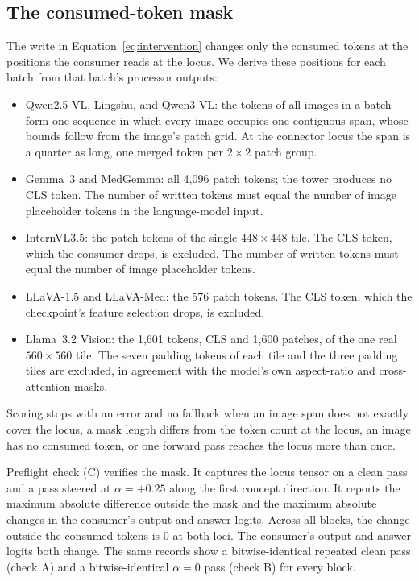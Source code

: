 \subsection{The consumed-token mask}
\label{app:repro-mask}

The write in Equation~\ref{eq:intervention} changes only the consumed tokens at the positions the consumer reads at the locus. We derive these positions for each batch from that batch's processor outputs:

\begin{itemize}[leftmargin=*,itemsep=1pt,topsep=2pt]
\item Qwen2.5-VL, Lingshu, and Qwen3-VL: the tokens of all images in a batch form one sequence in which every image occupies one contiguous span, whose bounds follow from the image's patch grid. At the connector locus the span is a quarter as long, one merged token per $2\times2$ patch group.
\item Gemma~3 and MedGemma: all 4{,}096 patch tokens; the tower produces no CLS token. The number of written tokens must equal the number of image placeholder tokens in the language-model input.
\item InternVL3.5: the patch tokens of the single $448\times448$ tile. The CLS token, which the consumer drops, is excluded. The number of written tokens must equal the number of image placeholder tokens.
\item LLaVA-1.5 and LLaVA-Med: the 576 patch tokens. The CLS token, which the checkpoint's feature selection drops, is excluded.
\item Llama~3.2 Vision: the 1{,}601 tokens, CLS and 1{,}600 patches, of the one real $560\times560$ tile. The seven padding tokens of each tile and the three padding tiles are excluded, in agreement with the model's own aspect-ratio and cross-attention masks.
\end{itemize}

Scoring stops with an error and no fallback when an image span does not exactly cover the locus, a mask length differs from the token count at the locus, an image has no consumed token, or one forward pass reaches the locus more than once.

Preflight check (C) verifies the mask. It captures the locus tensor on a clean pass and a pass steered at $\alpha=+0.25$ along the first concept direction. It reports the maximum absolute difference outside the mask and the maximum absolute changes in the consumer's output and answer logits. Across all \cfBlocks{} blocks, the change outside the consumed tokens is $0$ at both loci. The consumer's output and answer logits both change. The same records show a bitwise-identical repeated clean pass (check A) and a bitwise-identical $\alpha=0$ pass (check B) for every block.

